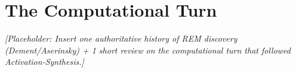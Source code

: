 \section{The Computational Turn}\label{sec:computational_turn}

\textit{[Placeholder: Insert one authoritative history of REM discovery (Dement/Aserinsky) + 1 short review on the computational turn that followed Activation-Synthesis.]}